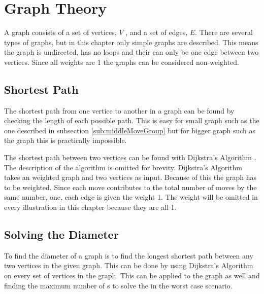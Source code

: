 \chapter {Graph Theory}
\label{chap:graphTheory}


A graph consists of a set of vertices, $V$ \cite[p. 592]{Rosen07}, and a set of edges, $E$. There are several types of graphs, but in this chapter only simple graphs are described. This means the graph is undirected, has no loops and their can only be one edge between two vertices. Since all weights are 1 the graphs can be considered non-weighted.

\section{Shortest Path}
The shortest path from one vertice to another in a graph can be found by checking the length of each possible path. This is easy for small graph such as the one described in subsection \ref{sub:middleMoveGroup} but for bigger graph such as the \rubik{} graph this is practically impossible. 

The shortest path between two vertices can be found with Dijkstra's Algorithm \cite[p. 651]{Rosen07}. The description of the algorithm is omitted for brevity. Dijkstra's Algorithm takes an weighted graph and two vertices as input. Because of this the \rubik{} graph has to be weighted. Since each move contributes to the total number of moves by the same number, one, each edge is given the weight 1. The weight will be omitted in every illustration in this chapter because they are all 1.  

\section{Solving the Diameter}
To find the diameter of a graph is to find the longest shortest path between any two vertices in the given graph. This can be done by using Dijkstra's Algorithm on every set of vertices in the graph. This can be applied to the \rubik{} graph as well and finding the maximum number of \twist{}s to solve the \rubik{} in the worst case scenario. %

